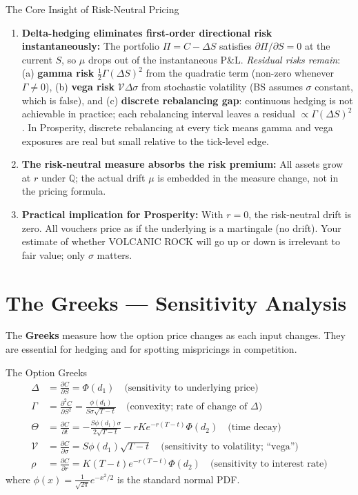 \documentclass[12pt,a4paper,openany]{report}
\theoremstyle{definition}
\begin{document}
\begin{keyconceptbox}{The Core Insight of Risk-Neutral Pricing}
\begin{enumerate}[label=\arabic*.]
  \item \textbf{Delta-hedging eliminates first-order directional risk instantaneously:} The portfolio $\Pi = C - \Delta S$ satisfies $\partial\Pi/\partial S = 0$ at the current $S$, so $\mu$ drops out of the instantaneous P\&L. \emph{Residual risks remain}: (a) \textbf{gamma risk} $\frac{1}{2}\Gamma(\Delta S)^2$ from the quadratic term (non-zero whenever $\Gamma \neq 0$), (b) \textbf{vega risk} $\mathcal{V}\Delta\sigma$ from stochastic volatility (BS assumes $\sigma$ constant, which is false), and (c) \textbf{discrete rebalancing gap}: continuous hedging is not achievable in practice; each rebalancing interval leaves a residual $\propto \Gamma(\Delta S)^2$. In Prosperity, discrete rebalancing at every tick means gamma and vega exposures are real but small relative to the tick-level edge.
  \item \textbf{The risk-neutral measure absorbs the risk premium:} All assets grow at $r$ under $\mathbb{Q}$; the actual drift $\mu$ is embedded in the measure change, not in the pricing formula.
  \item \textbf{Practical implication for Prosperity:} With $r = 0$, the risk-neutral drift is zero. All vouchers price as if the underlying is a martingale (no drift). Your estimate of whether VOLCANIC ROCK will go up or down is irrelevant to fair value; only $\sigma$ matters.
\end{enumerate}
\end{keyconceptbox}

\section{The Greeks — Sensitivity Analysis}

The \textbf{Greeks} measure how the option price changes as each input changes. They are essential for hedging and for spotting mispricings in competition.

\begin{definitionbox}{The Option Greeks}
\begin{align}
  \Delta &= \frac{\partial C}{\partial S} = \Phi(d_1) \quad \text{(sensitivity to underlying price)} \\[4pt]
  \Gamma &= \frac{\partial^2 C}{\partial S^2} = \frac{\phi(d_1)}{S\sigma\sqrt{T-t}} \quad \text{(convexity; rate of change of $\Delta$)} \\[4pt]
  \Theta &= \frac{\partial C}{\partial t} = -\frac{S\phi(d_1)\sigma}{2\sqrt{T-t}} - rK e^{-r(T-t)}\Phi(d_2) \quad \text{(time decay)} \\[4pt]
  \mathcal{V} &= \frac{\partial C}{\partial \sigma} = S\phi(d_1)\sqrt{T-t} \quad \text{(sensitivity to volatility; ``vega'')} \\[4pt]
  \rho &= \frac{\partial C}{\partial r} = K(T-t)e^{-r(T-t)}\Phi(d_2) \quad \text{(sensitivity to interest rate)}
\end{align}
where $\phi(x) = \frac{1}{\sqrt{2\pi}}e^{-x^2/2}$ is the standard normal PDF.
\end{definitionbox}
\end{document}
